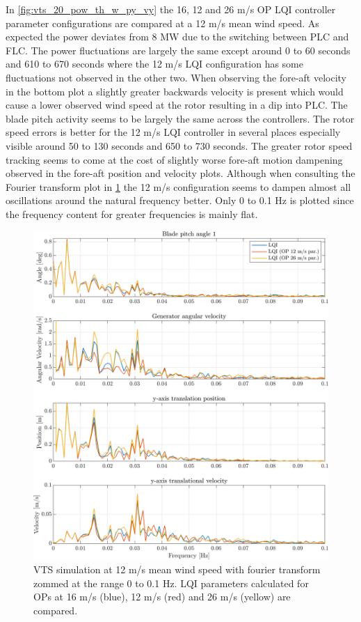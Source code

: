 In \cref{fig:vts_20_pow_th_w_py_vy} the 16, 12 and 26 m/s OP LQI controller parameter configurations are compared at a 12 m/s mean wind speed. As expected the power deviates from 8 MW due to the switching between PLC and FLC. The power fluctuations are largely the same except around 0 to 60 seconds and 610 to 670 seconds where the 12 m/s LQI configuration has some fluctuations not observed in the other two. When observing the fore-aft velocity in the bottom plot a slightly greater backwards velocity is present which would cause a lower observed wind speed at the rotor resulting in a dip into PLC. The blade pitch activity seems to be largely the same across the controllers. The rotor speed errors is better for the 12 m/s LQI controller in several places especially visible around 50 to 130 seconds and 650 to 730 seconds. The greater rotor speed tracking seems to come at the cost of slightly worse fore-aft motion dampening observed in the fore-aft position and velocity plots. Although when consulting the Fourier transform plot in \cref{fig:vts_21_fft_th_w_py_vy} the 12 m/s configuration seems to dampen almost all oscillations around the natural frequency better. Only 0 to 0.1 Hz is plotted since the frequency content for greater frequencies is mainly flat.

\begin{figure}[ht]
	\centering
	\includegraphics[width=0.7\linewidth]{Graphics/TestResults/VTSplotting/21_fft_th_w_py_vy.png}
	\caption{VTS simulation at 12 m/s mean wind speed with fourier transform zommed at the range 0 to 0.1 Hz. LQI parameters calculated for OPs at 16 m/s (blue), 12 m/s (red) and 26 m/s (yellow) are compared.}
	\label{fig:vts_21_fft_th_w_py_vy}
\end{figure}

